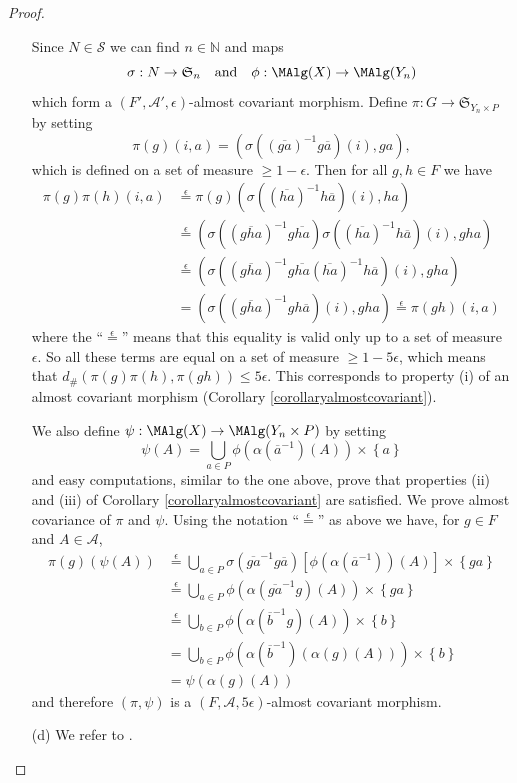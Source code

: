 \begin{proof}
\begin{enumerate}
Since $N\in\mathscr{S}$ we can find $n\in\mathbb{N}$ and maps
\[\sigma:N\to\mathfrak{S}_n\quad\text{and}\quad\phi:\MAlg(X)\to\MAlg(Y_n)\]
which form a $(F',\mathcal{A}',\epsilon)$-almost covariant morphism. Define $\pi:G\to\mathfrak{S}_{Y_n\times P}$ by setting
\[\pi(g)(i,a)=(\sigma((\overline{ga})^{-1}g\overline{a})(i),ga),\]
which is defined on a set of measure $\geq 1-\epsilon$. Then for all $g,h\in F$ we have
\begin{align*}
\pi(g)\pi(h)(i,a)&\overset{\epsilon}{=}\pi(g)(\sigma((\overline{ha})^{-1}h\overline{a})(i),ha)\\
&\overset{\epsilon}{=}(\sigma((\overline{gha})^{-1}g\overline{ha})\sigma((\overline{ha})^{-1}h\overline{a})(i),gha)\\
&\overset{\epsilon}{=}(\sigma((\overline{gha})^{-1}g\overline{ha}(\overline{ha})^{-1}h\overline{a})(i),gha)\\
&=(\sigma((\overline{gha})^{-1}gh\overline{a})(i),gha)\overset{\epsilon}{=}\pi(gh)(i,a)
\end{align*}
where the ``$\overset{\epsilon}{=}$'' means that this equality is valid only up to a set of measure $\epsilon$. So all these terms are equal on a set of measure $\geq1-5\epsilon$, which means that $d_\#(\pi(g)\pi(h),\pi(gh))\leq5\epsilon$. This corresponds to property (i) of an almost covariant morphism (Corollary \ref{corollaryalmostcovariant}).

We also define $\psi:\MAlg(X)\to\MAlg(Y_n\times P)$ by setting
\[\psi(A)=\bigcup_{a\in P}\phi(\alpha(\overline{a}^{-1})(A))\times\left\{a\right\}\]
and easy computations, similar to the one above, prove that properties (ii) and (iii) of Corollary \ref{corollaryalmostcovariant} are satisfied. We prove almost covariance of $\pi$ and $\psi$. Using the notation ``$\overset{\epsilon}{=}$'' as above we have, for $g\in F$ and $A\in\mathcal{A}$,
\begin{align*}
\pi(g)(\psi(A))&\overset{\epsilon}{=}\bigcup_{a\in P}\sigma(\overline{ga}^{-1}g\overline{a})\left[\phi(\alpha(\overline{a}^{-1}))(A)\right]\times\left\{ga\right\}\\
&\overset{\epsilon}{=}\bigcup_{a\in P}\phi(\alpha(\overline{ga}^{-1}g)(A))\times\left\{ga\right\}\\
&\overset{\epsilon}{=}\bigcup_{b\in P}\phi(\alpha(\overline{b}^{-1}g)(A))\times\left\{b\right\}\\
&\overset{}{=}\bigcup_{b\in P}\phi(\alpha(\overline{b}^{-1})(\alpha(g)(A)))\times\left\{b\right\}\\
&=\psi(\alpha(g)(A))
\end{align*}
and therefore $(\pi,\psi)$ is a $(F,\mathcal{A},5\epsilon)$-almost covariant morphism.
\item[(d)] We refer to \cite[Theorem 3.17]{MR2826401}.\qedhere
\end{enumerate}
\end{proof}
%